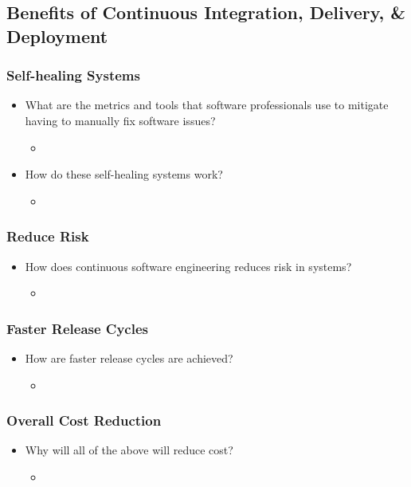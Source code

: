 \documentclass[11pt,a4paper]{article}
\begin{document}
	\subsection{Benefits of Continuous Integration, Delivery, \& Deployment}
		\subsubsection{Self-healing Systems}
		\begin{itemize}[noitemsep]
			\item What are the metrics and tools that software professionals use to mitigate having to manually fix software issues?
			\begin{itemize}
				\item
			\end{itemize}
			\item How do these self-healing systems work?
			\begin{itemize}
				\item
			\end{itemize}
		\end{itemize}
		\subsubsection{Reduce Risk}
		\begin{itemize}[noitemsep]
			\item How does continuous software engineering reduces risk in systems?
			\begin{itemize}
				\item
			\end{itemize}
		\end{itemize}
		\subsubsection{Faster Release Cycles}
		\begin{itemize}[noitemsep]
			\item How are faster release cycles are achieved?
			\begin{itemize}
				\item
			\end{itemize}
		\end{itemize}
		\subsubsection{Overall Cost Reduction}
		\begin{itemize}[noitemsep]
			\item Why will all of the above will reduce cost?
			\begin{itemize}
				\item
			\end{itemize}
		\end{itemize}
		
\end{document}
